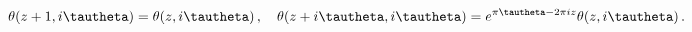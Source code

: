 \begin{equation}
\label{period-theta}
\theta ( z + 1 , i \tautheta ) = \theta ( z , i \tautheta ) \, , \quad 
\theta ( z + i \tautheta , i \tautheta ) = e^{\pi \tautheta - 2 \pi i z}
\theta ( z , i \tautheta ) \, .
\end{equation}

